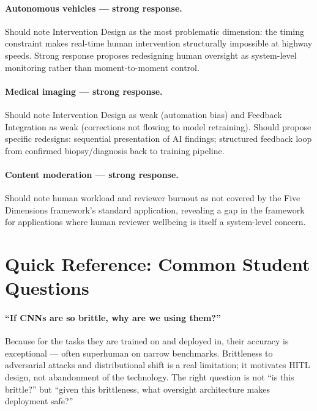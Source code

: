\paragraph{Autonomous vehicles --- strong response.}

Should note Intervention Design as the most problematic dimension: the timing constraint makes real-time human intervention structurally impossible at highway speeds. Strong response proposes redesigning human oversight as system-level monitoring rather than moment-to-moment control.

\paragraph{Medical imaging --- strong response.}

Should note Intervention Design as weak (automation bias) and Feedback Integration as weak (corrections not flowing to model retraining). Should propose specific redesigns: sequential presentation of AI findings; structured feedback loop from confirmed biopsy/diagnosis back to training pipeline.

\paragraph{Content moderation --- strong response.}

Should note human workload and reviewer burnout as not covered by the Five Dimensions framework's standard application, revealing a gap in the framework for applications where human reviewer wellbeing is itself a system-level concern.

\section{Quick Reference: Common Student Questions}

\paragraph{``If CNNs are so brittle, why are we using them?''}
Because for the tasks they are trained on and deployed in, their accuracy is exceptional --- often superhuman on narrow benchmarks. Brittleness to adversarial attacks and distributional shift is a real limitation; it motivates HITL design, not abandonment of the technology. The right question is not ``is this brittle?'' but ``given this brittleness, what oversight architecture makes deployment safe?''

